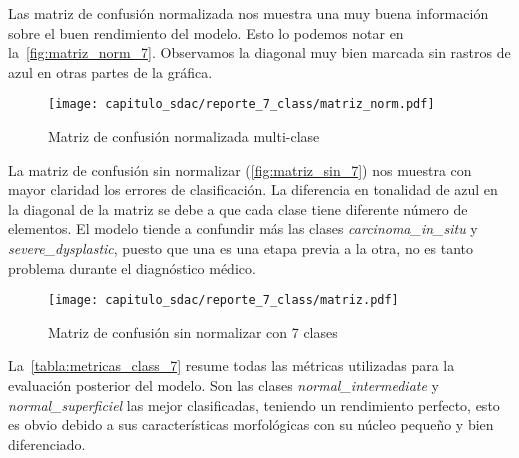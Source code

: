 Las matriz de confusión normalizada nos muestra una muy buena información sobre
el buen rendimiento del modelo. Esto lo podemos notar en
la~\autoref{fig:matriz_norm_7}. Observamos la diagonal muy bien marcada sin
rastros de azul en otras partes de la gráfica.

\begin{figure}[H]
    \centering
    \texttt{[image: capitulo\_sdac/reporte\_7\_class/matriz\_norm.pdf]}
    \caption{Matriz de confusión normalizada multi-clase}\label{fig:matriz_norm_7}
\end{figure}

La matriz de confusión sin normalizar (\autoref{fig:matriz_sin_7}) nos muestra
con mayor claridad los errores de clasificación. La diferencia en tonalidad de
azul en la diagonal de la matriz se debe a que cada clase tiene diferente número
de elementos. El modelo tiende a confundir más las clases
\emph{carcinoma\_in\_situ} y \emph{severe\_dysplastic}, puesto que una es una
etapa previa a la otra, no es tanto problema durante el diagnóstico médico.

\begin{figure}[H]
    \centering
    \texttt{[image: capitulo\_sdac/reporte\_7\_class/matriz.pdf]}
    \caption{Matriz de confusión sin normalizar con 7 clases}\label{fig:matriz_sin_7}
\end{figure}

La~\autoref{tabla:metricas_class_7} resume todas las métricas utilizadas para la
evaluación posterior del modelo. Son las clases \emph{normal\_intermediate} y
\emph{normal\_superficiel} las mejor clasificadas, teniendo un rendimiento
perfecto, esto es obvio debido a sus características morfológicas con su núcleo
pequeño y bien diferenciado. 

